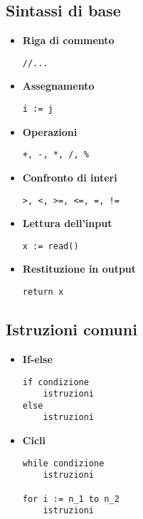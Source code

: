 \subsection{Sintassi di base}

\begin{multicols}{2} %

\begin{itemize}
    \item \textbf{Riga di commento}
    \begin{lstlisting}
//...
    \end{lstlisting}
    \item \textbf{Assegnamento}
    \begin{lstlisting}
i := j
    \end{lstlisting}
    \item \textbf{Operazioni}
    \begin{lstlisting}
+, -, *, /, %
    \end{lstlisting}
    \item \textbf{Confronto di interi}
    \begin{lstlisting}
>, <, >=, <=, =, !=
    \end{lstlisting}
    \item \textbf{Lettura dell'input}
    \begin{lstlisting}
x := read()
    \end{lstlisting}
    \item \textbf{Restituzione in output}
    \begin{lstlisting}
return x
    \end{lstlisting}
\end{itemize}

\end{multicols}

\subsection{Istruzioni comuni}

\begin{multicols}{2} %

\begin{itemize}
    \item \textbf{If-else}
    \begin{lstlisting}
if condizione
    istruzioni
else
    istruzioni
    \end{lstlisting}
    \item \textbf{Cicli}
    \begin{lstlisting}
while condizione
    istruzioni

for i := n_1 to n_2
    istruzioni
    \end{lstlisting}
\end{itemize}

\end{multicols}

